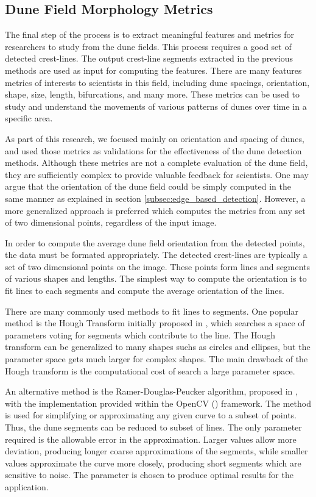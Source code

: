 \subsection{Dune Field Morphology Metrics} \label{subsec:dune-field-metrics}
The final step of the process is to extract meaningful features and metrics for researchers to study from the dune fields. This process requires a good set of detected crest-lines. The output crest-line segments extracted in the previous methods are used as input for computing the features. There are many features metrics of interests to scientists in this field, including dune spacings, orientation, shape, size, length, bifurcations, and many more. These metrics can be used to study and understand the movements of various patterns of dunes over time in a specific area.

As part of this research, we focused mainly on orientation and spacing of dunes, and used those metrics as validations for the effectiveness of the dune detection methods. Although these metrics are not a complete evaluation of the dune field, they are sufficiently complex to provide valuable feedback for scientists. One may argue that the orientation of the dune field could be simply computed in the same manner as explained in section \ref{subsec:edge_based_detection}. However, a more generalized approach is preferred which computes the metrics from any set of two dimensional points, regardless of the input image. 

In order to compute the average dune field orientation from the detected points, the data must be formated appropriately. The detected crest-lines are typically a set of two dimensional points on the image. These points form lines and segments of various shapes and lengths. The simplest way to compute the orientation is to fit lines to each segments and compute the average orientation of the lines.

There are many commonly used methods to fit lines to segments. One popular method is the Hough Transform initially proposed in \cite{hough-1959-paper,hough-1962-patent,hough-duda-1972-paper}, which searches a space of parameters voting for segments which contribute to the line. The Hough transform can be generalized to many shapes suchs as circles and ellipses, but the parameter space gets much larger for complex shapes. The main drawback of the Hough transform is the computational cost of search a large parameter space.

An alternative method is the Ramer-Douglas-Peucker algorithm, proposed in \cite{ramer-1972-paper,douglas-peucker-1973-paper,douglas-hershberger-snoeyink-1992-paper}, with the implementation provided within the OpenCV (\cite{opencv_library}) framework. The method is used for simplifying or approximating any given curve to a subset of points. Thus, the dune segments can be reduced to subset of lines. The only parameter required is the allowable error in the approximation. Larger values allow more deviation, producing longer coarse approximations of the segments, while smaller values approximate the curve more closely, producing short segments which are sensitive to noise. The parameter is chosen to produce optimal results for the application.

